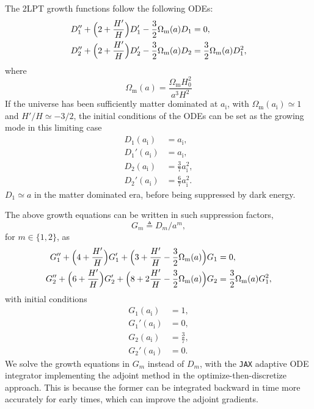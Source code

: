 \documentclass[modern, dvipsnames]{aastex631}
\newcommand{\Omegam}{\Omega_\mathrm{m}}
\newcommand{\ic}{\mathrm{i}}
\begin{document}
The 2LPT growth functions follow the following ODEs:
%
\begin{align}
D_1'' + \Bigl( 2 + \frac{H'}H \Bigr) D_1' - \frac32 \Omegam(a) D_1
  &= 0, \nonumber\\
%
D_2'' + \Bigl( 2 + \frac{H'}H \Bigr) D_2' - \frac32 \Omegam(a) D_2
  &= \frac32 \Omegam(a) D_1^2,
\end{align}
%
where
%
\begin{equation}
\Omegam(a) = \frac{\Omegam H_0^2}{a^3 H^2}
\end{equation}
%
If the universe has been sufficiently matter dominated at $a_\ic$, with
$\Omegam(a_\ic) \simeq 1$ and $H'/H \simeq -3/2$, the initial conditions
of the ODEs can be set as the growing mode in this limiting case
%
\begin{align}
D_1(a_\ic) &= a_\ic, \nonumber\\
D_1'(a_\ic) &= a_\ic, \nonumber\\
D_2(a_\ic) &= \frac37 a_\ic^2, \nonumber\\
D_2'(a_\ic) &= \frac67 a_\ic^2.
\end{align}
%
$D_1 \simeq a$ in the matter dominated era, before being suppressed by
dark energy.

The above growth equations can be written in such suppression factors,
%
\begin{equation}
G_m \triangleq D_m / a^m,
\end{equation}
%
for $m \in \{1, 2\}$, as
%
\begin{align}
G_1'' + \Bigl( 4 + \frac{H'}H \Bigr) G_1'
  + \Bigl( 3 + \frac{H'}H - \frac32 \Omegam(a) \Bigr) G_1
  &= 0, \nonumber\\
%
G_2'' + \Bigl( 6 + \frac{H'}H \Bigr) G_2'
  + \Bigl( 8 + 2\frac{H'}H - \frac32 \Omegam(a) \Bigr) G_2
  &= \frac32 \Omegam(a) G_1^2,
\end{align}
%
with initial conditions
%
\begin{align}
G_1(a_\ic) &= 1, \nonumber\\
G_1'(a_\ic) &= 0, \nonumber\\
G_2(a_\ic) &= \frac37, \nonumber\\
G_2'(a_\ic) &= 0.
\end{align}
%
We solve the growth equations in $G_m$ instead of $D_m$, with the
\texttt{JAX} adaptive ODE integrator implementing the adjoint method in
the optimize-then-discretize approach.
This is because the former can be integrated backward in time more
accurately for early times, which can improve the adjoint gradients.
\end{document}

